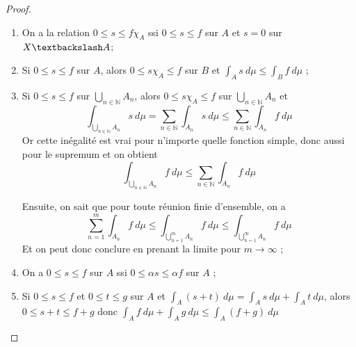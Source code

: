 \begin{proof}
    \begin{enumerate}[label=(\roman*)]
        \item On a la relation $0\leq s\leq f\chi_A$ ssi $0\leq s\leq f$ sur $A$ et $s=0$ sur $X\textbackslash A$;
        \item Si $0\leq s \leq f$ sur $A$, alors $0\leq s\chi_A\leq f$ sur $B$ et $\int_As\ d\mu\leq\int_Bf\ d\mu$ ;
        \item Si $0\leq s \leq f$ sur $\bigcup_{n\in\mathbb{N}}A_n$, alors $0\leq s\chi_A\leq f$ sur $\bigcup_{n\in\mathbb{N}}A_n$ et
        \begin{equation*}
            \int_{\bigcup_{n\in\mathbb{N}}A_n}s\ d\mu = \sum_{n\in\mathbb{N}}\int_{A_n}s\ d\mu \leq \sum_{n\in\mathbb{N}}\int_{A_n}f\ d\mu
        \end{equation*}
        Or cette inégalité est vrai pour n'importe quelle fonction simple, donc aussi pour le supremum et on obtient
        \begin{equation*}
            \int_{\bigcup_{n\in\mathbb{N}}A_n}f\ d\mu\leq\sum_{n\in\mathbb{N}}\int_{A_n}f\ d\mu
        \end{equation*}
        
        Ensuite, on sait que pour toute réunion finie d'ensemble, on a
        \begin{equation*}
            \sum_{n=1}^m \int_{A_n}f\ d\mu \leq \int_{\bigcup_{n=1}^mA_n}f\ d\mu \leq\int_{\bigcup_{n=1}^\infty A_n} f \ d\mu
        \end{equation*}
        Et on peut donc conclure en prenant la limite pour $m\to\infty$ ;
        \item On a $0\leq s\leq f$ sur $A$ ssi $0\leq \alpha s\leq \alpha f$ sur $A$ ;
        \item Si $0\leq s \leq f$ et $0\leq t\leq g$ sur $A$ et $\int_A (s+t)\ d\mu = \int_As\ d\mu + \int_At\ d\mu$, alors $0\leq s+t\leq f+g$ donc $\int_Af\ d\mu+\int_Ag\ d\mu\leq \int_A(f+g)\ d\mu$
        

\end{enumerate}
\end{proof}
